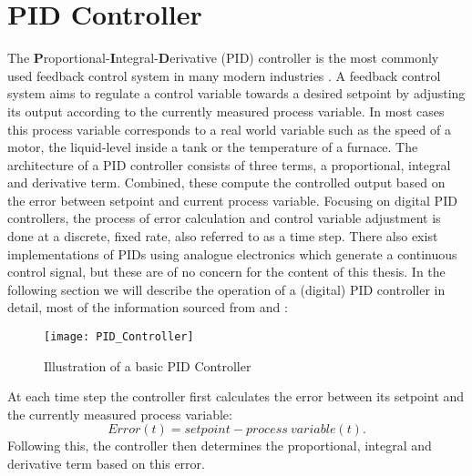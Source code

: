 \section{PID Controller}
The \textbf{P}roportional-\textbf{I}ntegral-\textbf{D}erivative (PID) controller is the most commonly used feedback control system in many modern industries \parencite{aastrom2002control}.
A feedback control system aims to regulate a control variable towards a desired setpoint by adjusting its output according to the currently measured process variable.
In most cases this process variable corresponds to a real world variable such as the speed of a motor, the liquid-level inside a tank or the temperature of a furnace.
The architecture of a PID controller consists of three terms, a proportional, integral and derivative term.
Combined, these compute the controlled output based on the error between setpoint and current process variable.
Focusing on digital PID controllers, the process of error calculation and control variable adjustment is done at a discrete, fixed rate, also referred to as a time step.
There also exist implementations of PIDs using analogue electronics which generate a continuous control signal, but these are of no concern for the content of this thesis.
In the following section we will describe the operation of a (digital) PID controller in detail, most of the information sourced from \cite{MATLAB_PID_playlist} and \cite{TLK_Energy_PID_Explanations}:

\begin{figure}[h]
	\centerline{\texttt{[image: PID\_Controller]}}
	\caption{Illustration of a basic PID Controller}
	\label{figure: PID Controller}
\end{figure}


At each time step the controller first calculates the error between its setpoint and the currently measured process variable: 
\[
	Error(t) = setpoint - process\ variable(t)
.\]
Following this, the controller then determines the proportional, integral and derivative term based on this error.

